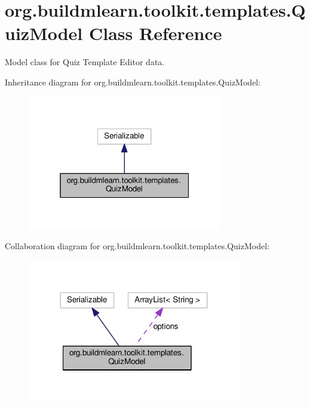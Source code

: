 \hypertarget{classorg_1_1buildmlearn_1_1toolkit_1_1templates_1_1QuizModel}{}\section{org.\+buildmlearn.\+toolkit.\+templates.\+Quiz\+Model Class Reference}
\label{classorg_1_1buildmlearn_1_1toolkit_1_1templates_1_1QuizModel}


Model class for Quiz Template Editor data.  




Inheritance diagram for org.\+buildmlearn.\+toolkit.\+templates.\+Quiz\+Model\+:
\nopagebreak
\begin{figure}[H]
\begin{center}
\leavevmode
\includegraphics[width=241pt]{classorg_1_1buildmlearn_1_1toolkit_1_1templates_1_1QuizModel__inherit__graph}
\end{center}
\end{figure}


Collaboration diagram for org.\+buildmlearn.\+toolkit.\+templates.\+Quiz\+Model\+:
\nopagebreak
\begin{figure}[H]
\begin{center}
\leavevmode
\includegraphics[width=264pt]{classorg_1_1buildmlearn_1_1toolkit_1_1templates_1_1QuizModel__coll__graph}
\end{center}
\end{figure}

